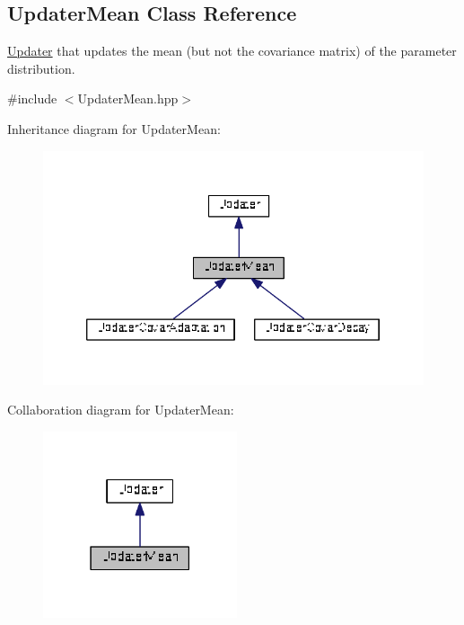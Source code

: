 \hypertarget{classDmpBbo_1_1UpdaterMean}{\subsection{Updater\+Mean Class Reference}
\label{classDmpBbo_1_1UpdaterMean}
}


\hyperlink{classDmpBbo_1_1Updater}{Updater} that updates the mean (but not the covariance matrix) of the parameter distribution.  




{\ttfamily \#include $<$Updater\+Mean.\+hpp$>$}



Inheritance diagram for Updater\+Mean\+:
\nopagebreak
\begin{figure}[H]
\begin{center}
\leavevmode
\includegraphics[width=346pt]{classDmpBbo_1_1UpdaterMean__inherit__graph}
\end{center}
\end{figure}


Collaboration diagram for Updater\+Mean\+:
\nopagebreak
\begin{figure}[H]
\begin{center}
\leavevmode
\includegraphics[width=162pt]{classDmpBbo_1_1UpdaterMean__coll__graph}
\end{center}
\end{figure}
